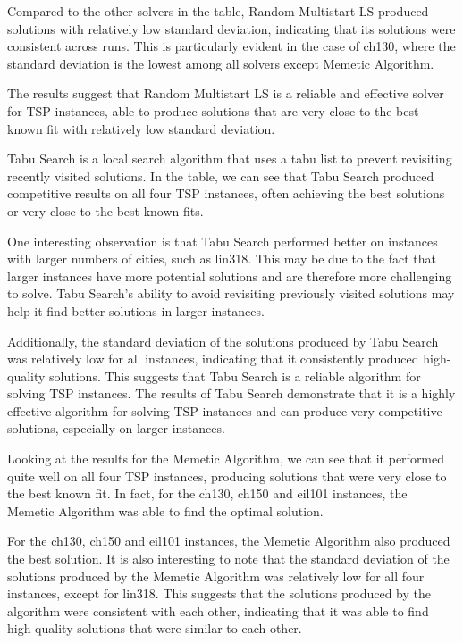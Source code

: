 \documentclass[conference]{IEEEtran}
\begin{document}
    Compared to the other solvers in the table, Random Multistart LS produced solutions with relatively low standard deviation, indicating that its solutions were consistent across runs. This is particularly evident in the case of ch130, where the standard deviation is the lowest among all solvers except Memetic Algorithm.

    The results suggest that Random Multistart LS is a reliable and effective solver for TSP instances, able to produce solutions that are very close to the best-known fit with relatively low standard deviation.

    Tabu Search is a local search algorithm that uses a tabu list to prevent revisiting recently visited solutions. In the table, we can see that Tabu Search produced competitive results on all four TSP instances, often achieving the best solutions or very close to the best known fits.

    One interesting observation is that Tabu Search performed better on instances with larger numbers of cities, such as lin318. This may be due to the fact that larger instances have more potential solutions and are therefore more challenging to solve. Tabu Search's ability to avoid revisiting previously visited solutions may help it find better solutions in larger instances.

    Additionally, the standard deviation of the solutions produced by Tabu Search was relatively low for all instances, indicating that it consistently produced high-quality solutions. This suggests that Tabu Search is a reliable algorithm for solving TSP instances. The results of Tabu Search demonstrate that it is a highly effective algorithm for solving TSP instances and can produce very competitive solutions, especially on larger instances.

    Looking at the results for the Memetic Algorithm, we can see that it performed quite well on all four TSP instances, producing solutions that were very close to the best known fit. In fact, for the ch130, ch150 and eil101 instances, the Memetic Algorithm was able to find the optimal solution.

    For the ch130, ch150 and eil101 instances, the Memetic Algorithm also produced the best solution. It is also interesting to note that the standard deviation of the solutions produced by the Memetic Algorithm was relatively low for all four instances, except for lin318. This suggests that the solutions produced by the algorithm were consistent with each other, indicating that it was able to find high-quality solutions that were similar to each other.
\end{document}
